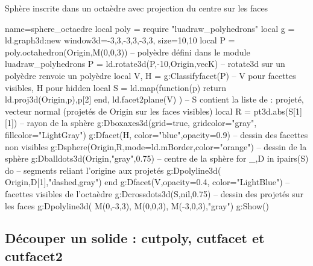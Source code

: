 \begin{itemize}
\begin{demo}{Sphère inscrite dans un octaèdre avec projection du centre sur les faces}
\begin{luadraw}{name=sphere_octaedre}
local poly = require "luadraw_polyhedrons"
local g = ld.graph3d:new{ window3d={-3,3,-3,3,-3,3}, size={10,10}}
local P = poly.octahedron(Origin,M(0,0,3)) -- polyèdre défini dans le module luadraw_polyhedrons
P = ld.rotate3d(P,-10,{Origin,vecK}) -- rotate3d sur un polyèdre renvoie un polyèdre
local V, H = g:Classifyfacet(P) -- V pour facettes visibles, H pour hidden
local S = ld.map(function(p) return {ld.proj3d(Origin,p),p[2]} end, ld.facet2plane(V) )
-- S contient la liste de : {projeté, vecteur normal} (projetés de Origin sur les faces visibles)
local R = pt3d.abs(S[1][1]) -- rayon de la sphère
g:Dboxaxes3d({grid=true, gridcolor="gray", fillcolor="LightGray"})
g:Dfacet(H, {color="blue",opacity=0.9}) -- dessin des facettes non visibles
g:Dsphere(Origin,R,{mode=ld.mBorder,color="orange"}) -- dessin de la sphère
g:Dballdots3d(Origin,"gray",0.75) -- centre de la sphère
for _,D in ipairs(S) do -- segments reliant l'origine aux projetés
    g:Dpolyline3d( {Origin,D[1]},"dashed,gray")
end
g:Dfacet(V,{opacity=0.4, color="LightBlue"}) -- facettes visibles de l'octaèdre
g:Dcrossdots3d(S,nil,0.75) -- dessin des projetés sur les faces
g:Dpolyline3d( {M(0,-3,3), M(0,0,3), M(-3,0,3)},"gray")
g:Show()
\end{luadraw}
\end{demo}
\end{itemize}

\subsection{Découper un solide : cutpoly, cutfacet et cutfacet2}

